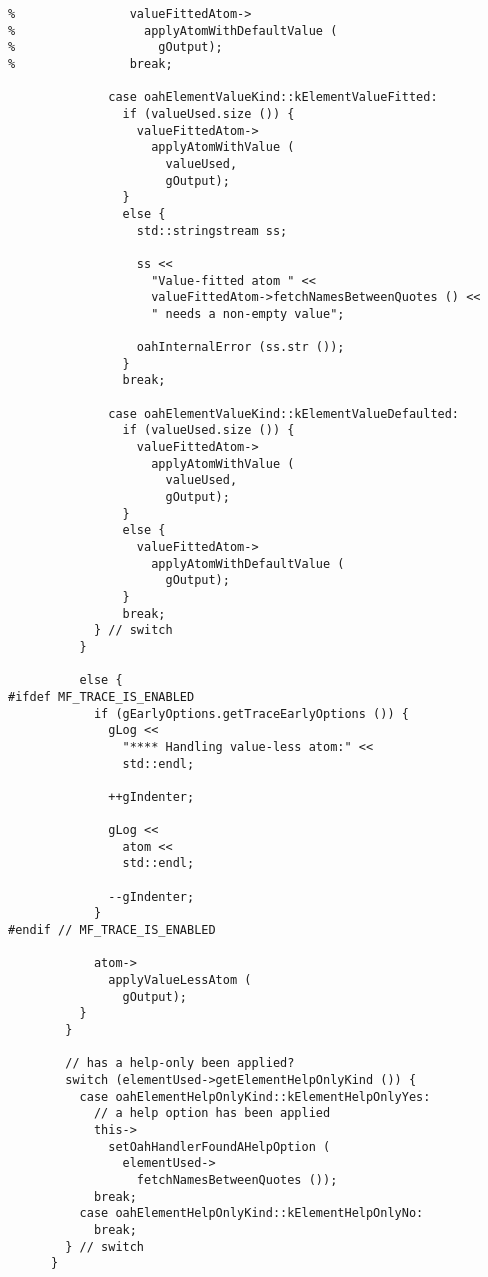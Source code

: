 {\begin{lstlisting}[language=CPlusPlus]
%              case oahElementValueKind::kElementValueImplicit:
%                valueFittedAtom->
%                  applyAtomWithDefaultValue (
%                    gOutput);
%                break;

              case oahElementValueKind::kElementValueFitted:
                if (valueUsed.size ()) {
                  valueFittedAtom->
                    applyAtomWithValue (
                      valueUsed,
                      gOutput);
                }
                else {
                  std::stringstream ss;

                  ss <<
                    "Value-fitted atom " <<
                    valueFittedAtom->fetchNamesBetweenQuotes () <<
                    " needs a non-empty value";

                  oahInternalError (ss.str ());
                }
                break;

              case oahElementValueKind::kElementValueDefaulted:
                if (valueUsed.size ()) {
                  valueFittedAtom->
                    applyAtomWithValue (
                      valueUsed,
                      gOutput);
                }
                else {
                  valueFittedAtom->
                    applyAtomWithDefaultValue (
                      gOutput);
                }
                break;
            } // switch
          }

          else {
#ifdef MF_TRACE_IS_ENABLED
            if (gEarlyOptions.getTraceEarlyOptions ()) {
              gLog <<
                "**** Handling value-less atom:" <<
                std::endl;

              ++gIndenter;

              gLog <<
                atom <<
                std::endl;

              --gIndenter;
            }
#endif // MF_TRACE_IS_ENABLED

            atom->
              applyValueLessAtom (
                gOutput);
          }
        }

        // has a help-only been applied?
        switch (elementUsed->getElementHelpOnlyKind ()) {
          case oahElementHelpOnlyKind::kElementHelpOnlyYes:
            // a help option has been applied
            this->
              setOahHandlerFoundAHelpOption (
                elementUsed->
                  fetchNamesBetweenQuotes ());
            break;
          case oahElementHelpOnlyKind::kElementHelpOnlyNo:
            break;
        } // switch
      }


\end{lstlisting}}
